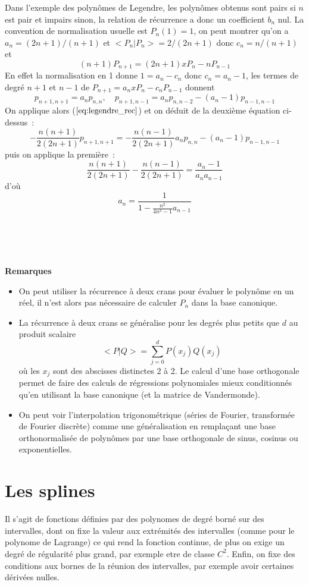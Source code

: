 \documentclass[a4paper,11pt]{book}
\begin{document}
\begin{giacjshere}
Dans l'exemple des polyn\^omes de Legendre, les polyn\^omes obtenus
sont pairs si $n$ est pair et impairs sinon, la relation de 
r\'ecurrence a donc un coefficient $b_n$ nul. La convention
de normalisation usuelle est $P_n(1)=1$, on peut montrer qu'on a
$a_n=(2n+1)/(n+1)$ et $<P_n|P_n>=2/(2n+1)$ 
donc $c_n=n/(n+1)$ et
$$ (n+1)P_{n+1}=(2n+1)xP_n-nP_{n-1} $$
En effet la normalisation en 1 donne $1=a_n-c_n$ donc $c_n=a_n-1$,
les termes de degr\'e $n+1$ et $n-1$ de $P_{n+1}=a_nxP_n-c_nP_{n-1}$ donnent
$$ p_{n+1,n+1}=a_np_{n,n}, \quad p_{n+1,n-1}=a_n
p_{n,n-2}-(a_n-1)p_{n-1,n-1}$$
On applique alors (\(\ref{eq:legendre_rec}\)) et on d\'eduit de la
deuxi\`eme \'equation ci-dessus~:
$$ -\frac{n(n+1)}{2(2n+1)} p_{n+1,n+1}= -\frac{n(n-1)}{2(2n+1)} a_n
p_{n,n}-(a_n-1)p_{n-1,n-1}$$
puis on applique la premi\`ere~:
$$ \frac{n(n+1)}{2(2n+1)} -
\frac{n(n-1)}{2(2n+1)}=\frac{a_n-1}{a_na_{n-1}}$$
d'o\`u 
$$ a_n=\frac{1}{1-\frac{n^2}{4n^2-1} a_{n-1}}$$



\\
\\
\\

{\bf Remarques}
\begin{itemize}
\item On peut utiliser la r\'ecurrence \`a deux crans pour \'evaluer
le polyn\^ome en un r\'eel, il n'est alors pas n\'ecessaire
de calculer $P_n$ dans la base canonique.
\item La r\'ecurrence \`a deux crans se g\'en\'eralise pour les degr\'es
plus petits que $d$ au produit scalaire
$$ <P|Q>=\sum_{j=0}^d P(x_j) Q(x_j) $$
o\`u les $x_j$ sont des abscisses distinctes 2 \`a 2. Le calcul
d'une base orthogonale permet de
faire des calculs de r\'egressions polynomiales mieux conditionn\'es
qu'en utilisant la base canonique (et la matrice de Vandermonde).
\item
On peut voir l'interpolation trigonom\'etrique (s\'eries de Fourier,
transform\'ee de Fourier discr\`ete) comme une
g\'en\'eralisation en rempla\c{c}ant une base orthonormalis\'ee
de polyn\^omes par une base orthogonale de sinus, cosinus
ou exponentielles.
\end{itemize}

\section{Les splines}
Il s'agit de fonctions définies par des polynomes de degré borné
sur des intervalles, dont on fixe la valeur
aux extrémités des intervalles (comme pour le polynome de Lagrange)
ce qui rend la fonction continue, de plus on exige un
degré de régularité plus grand, par exemple etre de classe $C^2$.
Enfin, on fixe des conditions aux bornes de la réunion des 
intervalles, par exemple avoir certaines dérivées nulles. 


\end{giacjshere}
\end{document}
